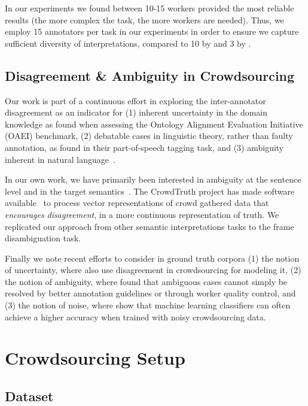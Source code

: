In our experiments we found between 10-15 workers provided the most reliable results (the more complex the task, the more workers are needed). Thus, we employ 15 annotators per task in our experiments in order to ensure we capture sufficient diversity of  interpretations, compared to 10 by \citet{Hong:2011:GCR:2018966.2018970} and 3 by \citet{jurgens2013embracing}.

\subsection{Disagreement \& Ambiguity in Crowdsourcing}

Our work is part of a continuous effort in exploring the inter-annotator disagreement as an indicator for (1) inherent uncertainty in the domain knowledge as \citet{cheatham2014conference} found when assessing the Ontology Alignment Evaluation Initiative (OAEI) benchmark, (2) debatable cases in linguistic theory, rather than faulty annotation, as \citet{plank-hovy-sogaard:2014:P14-2} found in their part-of-speech tagging task, and (3) ambiguity inherent in natural language~\cite{Bayerl2011}.

In our own work, we have primarily been interested in ambiguity at the sentence level and in the target semantics~\cite{DBLP:journals/corr/DumitracheAW17}.  The CrowdTruth project has made software available~\cite{inel2014crowdtruth} to process vector representations of crowd gathered data that \emph{encourages disagreement}, in a more continuous representation of truth. We replicated our  approach from other semantic interpretations tasks to the frame disambiguation task.

Finally we note recent efforts to consider in ground truth corpora (1) the notion of uncertainty, where \citet{schaekermann2016} also use disagreement in crowdsourcing for modeling it, (2) the notion of ambiguity, where \citet{Chang:2017:Revolt} found that ambiguous cases cannot simply be resolved by better annotation guidelines or through worker quality control, and (3) the notion of noise, where \citet{lin2014re} show that machine learning classifiers can often achieve a higher accuracy when trained with noisy crowdsourcing data.


\section{Crowdsourcing Setup}
\label{sec:frame-crowd-setup}

\subsection{Dataset}

